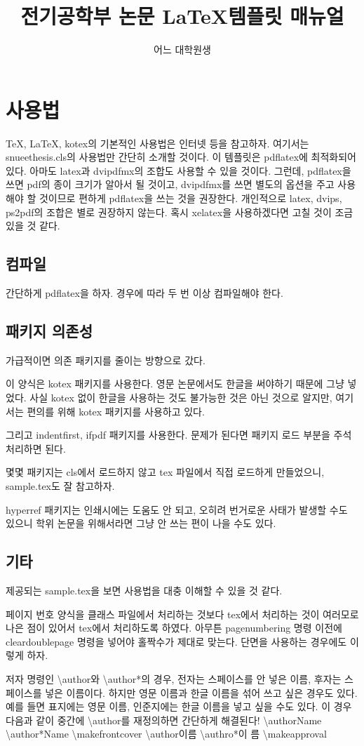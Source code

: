 \documentclass[a4paper]{report}
\title{전기공학부 논문 \LaTeX 템플릿 매뉴얼}
\author{어느 대학원생}
\begin{document}
\tableofcontents

\chapter{사용법}
\TeX, \LaTeX, kotex의 기본적인 사용법은 인터넷 등을 참고하자.
여기서는 snueethesis.cls의 사용법만 간단히 소개할 것이다.
이 템플릿은 pdflatex에 최적화되어 있다.
아마도 latex과 dvipdfmx의 조합도 사용할 수 있을 것이다.
그런데, pdflatex을 쓰면 pdf의 종이 크기가 알아서
될 것이고, dvipdfmx를 쓰면 별도의 옵션을 주고 사용해야 할 것이므로
편하게 pdflatex을 쓰는 것을 권장한다.
개인적으로 latex, dvips, ps2pdf의 조합은 별로 권장하지 않는다.
혹시 xelatex을 사용하겠다면 고칠 것이 조금 있을 것 같다.
\section{컴파일}
간단하게 pdflatex을 하자. 경우에 따라 두 번 이상 컴파일해야 한다.
\section{패키지 의존성}
가급적이면 의존 패키지를 줄이는 방향으로 갔다.

이 양식은 kotex 패키지를 사용한다.
영문 논문에서도 한글을 써야하기 때문에 그냥 넣었다.
사실 kotex 없이 한글을 사용하는 것도 불가능한 것은
아닌 것으로 알지만, 여기서는 편의를 위해 kotex 패키지를 사용하고 있다.

그리고 indentfirst, ifpdf 패키지를 사용한다.
문제가 된다면 패키지 로드 부분을 주석처리하면 된다.

몇몇 패키지는 cls에서 로드하지 않고 tex 파일에서
직접 로드하게 만들었으니, sample.tex도 잘 참고하자.

hyperref 패키지는 인쇄시에는 도움도
안 되고, 오히려 번거로운 사태가 발생할 수도 있으니
학위 논문을 위해서라면 그냥 안 쓰는 편이
나을 수도 있다.
\section{기타}
제공되는 sample.tex을 보면
사용법을 대충 이해할 수 있을 것 같다.

페이지 번호 양식을
클래스 파일에서 처리하는 것보다 tex에서
처리하는 것이 여러모로 나은 점이
있어서 tex에서 처리하도록 하였다.
아무튼 pagenumbering 명령 이전에
cleardoublepage 명령을 넣어야
홀짝수가 제대로 맞는다.
단면을 사용하는 경우에도 이렇게 하자.

저자 명령인 \textbackslash author와 \textbackslash author*의 경우,
전자는 스페이스를 안 넣은 이름, 후자는 스페이스를 넣은 이름이다.
하지만 영문 이름과 한글 이름을 섞어 쓰고 싶은 경우도 있다.
예를 들면 표지에는 영문 이름, 인준지에는 한글 이름을 넣고
싶을 수도 있다.
이 경우 다음과 같이 중간에 \textbackslash author를 재정의하면 간단하게
해결된다!
\textbackslash author{Name} \textbackslash author*{Name}
\textbackslash makefrontcover
\textbackslash author{이름} \textbackslash authro*{이 름}
\textbackslash makeapproval
\end{document}
